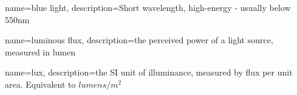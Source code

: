
\usepackage{glossaries}

\glstoctrue
\makenoidxglossaries

{
    name=blue light,
    description={Short wavelength, high-energy - usually below 550nm}
}

{
	name=luminous flux,
	description={the perceived power of a light source, measured in lumen}
}

{
	name=lux,
	description={the SI unit of illuminance, measured by \gls{flux} per unit area. Equivalent to $lumens/m^2$}
}








